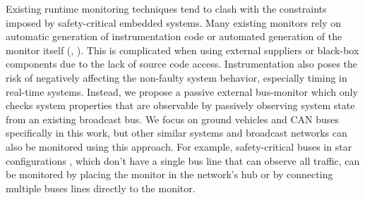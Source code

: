 Existing runtime monitoring techniques tend to clash with the constraints imposed by safety-critical embedded systems. 
Many existing monitors rely on automatic generation of instrumentation code or automated generation of the monitor itself (\eg, \cite{Havelund2004, Pike2011}).
This is complicated when using external suppliers or black-box components due to the lack of source code access. Instrumentation also poses the risk of negatively affecting the non-faulty system behavior, especially timing in real-time systems.
Instead, we propose a passive external bus-monitor which only checks system properties that are observable by passively observing system state from an existing broadcast bus.
We focus on ground vehicles and CAN buses specifically in this work, but other similar systems and broadcast networks can also be monitored using this approach.
For example, safety-critical buses in star configurations \cite{Rushby2001}, which don't have a single bus line that can observe all traffic, can be monitored by placing the monitor in the network's hub or by connecting multiple buses lines directly to the monitor. 

